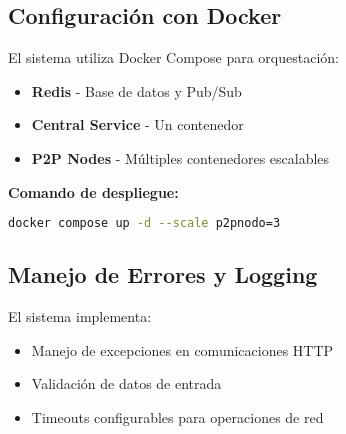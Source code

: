 \subsection*{Configuración con Docker}

El sistema utiliza Docker Compose para orquestación:

\begin{itemize}
    \item \textbf{Redis} - Base de datos y Pub/Sub
    \item \textbf{Central Service} - Un contenedor
    \item \textbf{P2P Nodes} - Múltiples contenedores escalables
\end{itemize}

\textbf{Comando de despliegue:}
\begin{lstlisting}[language=bash]
docker compose up -d --scale p2pnodo=3
\end{lstlisting}

\subsection*{Manejo de Errores y Logging}

El sistema implementa:
\begin{itemize}
    \item Manejo de excepciones en comunicaciones HTTP
    \item Validación de datos de entrada
    \item Timeouts configurables para operaciones de red
\end{itemize}